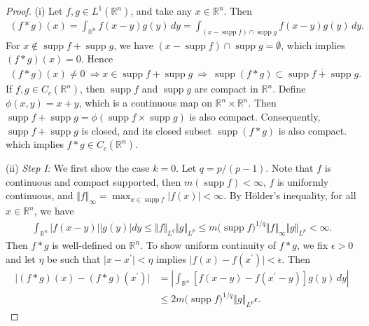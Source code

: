 \documentclass{article}
\numberwithin{equation}{section}
\newcommand{\bbR}{\mathbb{R}}
\DeclareMathOperator{\supp}{supp}
\theoremstyle{plain}
\theoremstyle{definition}
\begin{document}
\begin{proof}
	(i) Let $f,g\in L^1(\mathbb{R}^n)$, and take any $x\in\mathbb{R}^n$. Then
	\begin{align*}
		(f*g)(x) = \int_{\bbR^n} f(x-y)g(y)\,dy = \int_{(x-\supp f)\cap \supp g}f(x-y)g(y)\,dy.
	\end{align*}
	For $x\notin \supp f + \supp g$, we have $(x-\supp f)\cap \supp g=\emptyset$, which implies $(f*g)(x) = 0$. Hence
	\begin{align*}
		(f*g)(x)\neq 0\ \Rightarrow x\in \supp f + \supp g\ \Rightarrow\ \supp(f*g)\subset\overline{\supp f + \supp g}.
	\end{align*}
	If $f,g\in C_c(\mathbb{R}^n)$, then $\supp f$ and $\supp g$ are compact in $\mathbb{R}^n$. Define $\phi(x,y)=x+y$, which is a continuous map on $\mathbb{R}^n\times\bbR^n$. Then $\supp f + \supp g = \phi(\supp f\times\supp g)$ is also compact. Consequently, $\supp f + \supp g$ is closed, and its closed subset $\supp (f*g)$ is also compact. which implies $f*g\in C_c(\mathbb{R}^n)$.
	\vspace{0.1cm}
	
	(ii) \textit{Step I:} We first show the case $k=0$. Let $q=p/(p-1)$. Note that $f$ is continuous and compact supported, then $m(\supp f) < \infty$, $f$ is uniformly continuous, and $\Vert f\Vert_\infty = \max_{x\in\supp f}\vert f(x)\vert < \infty$. By Hölder's inequality, for all $x\in\mathbb{R}^n$, we have
	\begin{align*}
		\int_{\bbR^n}\left\vert f(x-y)\right\vert\left\vert g(y)\right\vert dy \leq \Vert f\Vert_{L^q}\Vert g\Vert_{L^p} \leq m\bigl(\supp f\bigr)^{1/q}\Vert f\Vert_\infty\Vert g\Vert_{L^p} < \infty.
	\end{align*}
	Then $f*g$ is well-defined on $\mathbb{R}^n$. To show uniform continuity of $f*g$, we fix $\epsilon>0$ and let $\eta$ be such that $\vert x-x^\prime\vert<\eta$ implies $\vert f(x)-f(x^\prime)\vert < \epsilon$. Then
	\begin{align*}
		\vert(f*g)(x) - (f*g)(x^\prime)\vert &= \left\vert\int_{\bbR^n} \left[f(x-y) - f(x^\prime-y)\right]g(y)\,dy\right\vert\\
		&\leq 2m\bigl(\supp f\bigr)^{1/q}\left\Vert g\right\Vert_{L^p}\epsilon.
	\end{align*}
	

\end{proof}
\end{document}
